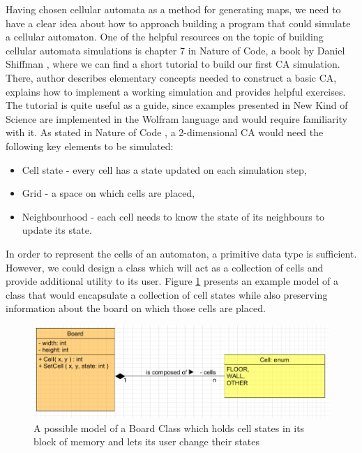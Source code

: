 \documentclass[12pt]{report}
\begin{document}
Having chosen cellular automata as a method for generating maps, we need to have a clear idea about how to approach building a program that could simulate a cellular automaton. One of the helpful resources on the topic of building cellular automata simulations is chapter 7 in Nature of Code, a book by Daniel Shiffman \autocite{shiffman2012nature}, where we can find a short tutorial to build our first CA simulation. There, author describes elementary concepts needed to construct a basic CA, explains how to implement a working simulation and provides helpful exercises. The tutorial is quite useful as a guide, since examples presented in New Kind of Science \autocite{wolfram2002new} are implemented in the Wolfram language and would require familiarity with it. As stated in Nature of Code \autocite{shiffman2012nature}, a 2-dimensional CA would need the following key elements to be simulated:

\begin{itemize}
	\item Cell state - every cell has a state updated on each simulation step,
	\item Grid - a space on which cells are placed,
	\item Neighbourhood - each cell needs to know the state of its neighbours to update its state.
\end{itemize}

In order to represent the cells of an automaton, a primitive data type is sufficient. However, we could design a class which will act as a collection of cells and provide additional utility to its user. Figure \ref{fig:boardcell} presents an example model of a class that would encapsulate a collection of cell states while also preserving information about the board on which those cells are placed. 

\begin{figure}[h]
	\centering
	\includegraphics[width=0.8\linewidth]{diagrams/boardcell01}
	\caption{ A possible model of a Board Class which holds cell states in its block of memory and lets its user change their states} 
	\label{fig:boardcell}
\end{figure}
\end{document}
